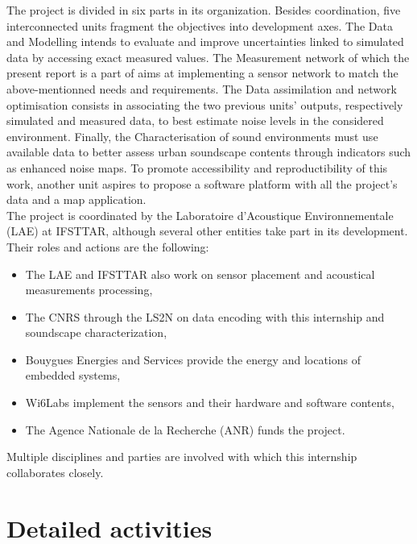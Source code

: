 \documentclass[12pt,times,onecolumn]{article}
\begin{document}
The project is divided in six parts in its organization. Besides coordination, five interconnected units fragment the objectives into development axes. The Data and Modelling intends to evaluate and improve uncertainties linked to simulated data by accessing exact measured values. The Measurement network of which the present report is a part of aims at implementing a sensor network to match the above-mentionned needs and requirements. The Data assimilation and network optimisation consists in associating the two previous units' outputs, respectively simulated and measured data, to best estimate noise levels in the considered environment. Finally, the Characterisation of sound environments must use available data to better assess urban soundscape contents through indicators such as enhanced noise maps. To promote accessibility and reproductibility of this work, another unit aspires to propose a software platform with all the project's data and a map application.\\

The project is coordinated by the Laboratoire d'Acoustique Environnementale (LAE) at IFSTTAR, although several other entities take part in its development. Their roles and actions are the following:
\begin{itemize}
\item The LAE and IFSTTAR also work on sensor placement and acoustical measurements processing,
\item The CNRS through the LS2N on data encoding with this internship and soundscape characterization,
\item Bouygues Energies and Services provide the energy and locations of embedded systems,
\item Wi6Labs implement the sensors and their hardware and software contents,
\item The Agence Nationale de la Recherche (ANR) funds the project.
\end{itemize}
Multiple disciplines and parties are involved with which this internship collaborates closely. 





\clearpage

\part{Detailed activities}
\setcounter{section}{0}
\end{document}
